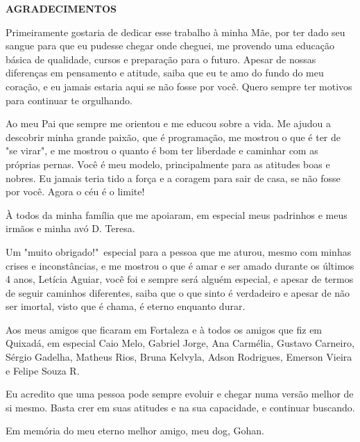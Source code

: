 
\begin{center}
	\bfseries\MakeUppercase{AGRADECIMENTOS}\par
\end{center}
	
Primeiramente gostaria de dedicar esse trabalho à minha Mãe, por ter dado seu sangue para que eu pudesse chegar onde cheguei, me provendo uma educação básica de qualidade, cursos e preparação para o futuro. Apesar de nossas diferenças em pensamento e atitude, saiba que eu te amo do fundo do meu coração, e eu jamais estaria aqui se não fosse por você. Quero sempre ter motivos para continuar te orgulhando.

Ao meu Pai que sempre me orientou e me educou sobre a vida. Me ajudou a descobrir minha grande paixão, que é programação, me mostrou o que é ter de "se virar", e me mostrou o quanto é bom ter liberdade e caminhar com as próprias pernas. Você é meu modelo, principalmente para as atitudes boas e nobres. Eu jamais teria tido a força e a coragem para sair de casa, se não fosse por você. Agora o céu é o limite!

À todos da minha família que me apoiaram, em especial meus padrinhos e meus irmãos e minha avó D. Teresa.

Um "muito obrigado!"\ especial para a pessoa que me aturou, mesmo com minhas crises e inconstâncias, e me mostrou o que é amar e ser amado durante os últimos 4 anos, Letícia Aguiar, você foi e sempre será alguém especial, e apesar de termos de seguir caminhos diferentes, saiba que o que sinto é verdadeiro e apesar de não ser imortal, visto que é chama, é eterno enquanto durar. %

Aos meus amigos que ficaram em Fortaleza e à todos os amigos que fiz em Quixadá, em especial Caio Melo, Gabriel Jorge, Ana Carmélia, Gustavo Carneiro, Sérgio Gadelha, Matheus Rios, Bruna Kelvyla, Adson Rodrigues, Emerson Vieira e Felipe Souza R.

Eu acredito que uma pessoa pode sempre evoluir e chegar numa versão melhor de si mesmo. Basta crer em suas atitudes e na sua capacidade, e continuar buscando.

Em memória do meu eterno melhor amigo, meu dog, Gohan.
